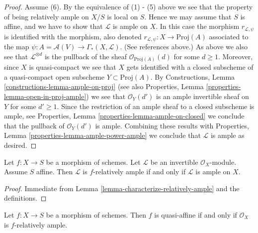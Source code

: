 \begin{proof}
\medskip\noindent
Assume (6). By the equivalence of (1) - (5) above we see that the
property of being relatively ample on $X/S$ is local on $S$. Hence
we may assume that $S$ is affine, and we have to show that
$\mathcal{L}$ is ample on $X$. In this case the morphism
$r_{\mathcal{L}, \psi}$ is identified with the morphism, also denoted
$r_{\mathcal{L}, \psi} : X \to \text{Proj}(A)$ associated to the map
$\psi : A = \mathcal{A}(V) \to \Gamma_*(X, \mathcal{L})$.
(See references above.) As above we also see that
$\mathcal{L}^{\otimes d}$ is the pullback of the sheaf
$\mathcal{O}_{\text{Proj}(A)}(d)$ for some $d \geq 1$.
Moreover, since $X$ is quasi-compact we
see that $X$ gets identified with a closed subscheme of a
quasi-compact open subscheme $Y \subset \text{Proj}(A)$.
By
Constructions, Lemma
\ref{constructions-lemma-ample-on-proj}
(see also
Properties, Lemma
\ref{properties-lemma-open-in-proj-ample})
we see that $\mathcal{O}_Y(d')$ is an ample invertible sheaf on
$Y$ for some $d' \geq 1$. Since the restriction of an ample
sheaf to a closed subscheme is ample, see
Properties, Lemma
\ref{properties-lemma-ample-on-closed}
we conclude that the pullback of
$\mathcal{O}_Y(d')$ is ample. Combining these results with
Properties, Lemma
\ref{properties-lemma-ample-power-ample}
we conclude that $\mathcal{L}$ is ample as desired.
\end{proof}

\begin{lemma}
\label{lemma-ample-over-affine}
\begin{reference}
\cite[II Corollary 4.6.6]{EGA}
\end{reference}
Let $f : X \to S$ be a morphism of schemes.
Let $\mathcal{L}$ be an invertible $\mathcal{O}_X$-module.
Assume $S$ affine.
Then $\mathcal{L}$ is $f$-relatively ample if and only
if $\mathcal{L}$ is ample on $X$.
\end{lemma}

\begin{proof}
Immediate from Lemma \ref{lemma-characterize-relatively-ample}
and the definitions.
\end{proof}

\begin{lemma}
\label{lemma-quasi-affine-O-ample}
\begin{reference}
\cite[II Proposition 5.1.6]{EGA}
\end{reference}
Let $f : X \to S$ be a morphism of schemes. Then $f$ is quasi-affine
if and only if $\mathcal{O}_X$ is $f$-relatively ample.
\end{lemma}

